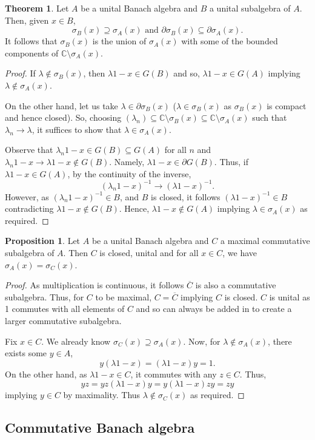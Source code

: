 \documentclass[]{article}
\theoremstyle{definition}
\newtheorem{theorem}{Theorem}
\newtheorem{proposition}{Proposition}[section]
\begin{document}
\begin{theorem}
  Let \(A\) be a unital Banach algebra and \(B\) a unital subalgebra of \(A\). Then, given \(x \in B\), 
  \[\sigma_B(x) \supseteq \sigma_A(x) \text{ and } \partial \sigma_B(x) \subseteq \partial \sigma_A(x).\]
  It follows that \(\sigma_B(x)\) is the union of \(\sigma_A(x)\) with some of the bounded components 
  of \(\mathbb{C} \setminus \sigma_A(x)\).
\end{theorem}
\begin{proof}
  If \(\lambda \not\in \sigma_B(x)\), then \(\lambda 1 - x \in G(B)\) and so, \(\lambda 1 - x \in G(A)\) 
  implying \(\lambda \not\in \sigma_A(x)\). 

  On the other hand, let us take \(\lambda \in \partial \sigma_B(x)\) (\(\lambda \in \sigma_B(x)\) as 
  \(\sigma_B(x)\) is compact and hence closed). So, choosing 
  \((\lambda_n) \subseteq \mathbb{C} \setminus \sigma_B(x) \subseteq \mathbb{C} \setminus \sigma_A(x)\) such that \(\lambda_n \to \lambda\), 
  it suffices to show that \(\lambda \in \sigma_A(x)\).

  Observe that \(\lambda_n 1 - x \in G(B) \subseteq G(A)\) for all \(n\) and 
  \(\lambda_n 1 - x \to \lambda 1 - x \not\in G(B)\). Namely, \(\lambda 1 - x \in \partial G(B)\). 
  Thus, if \(\lambda 1 - x \in G(A)\), by the continuity of the inverse, 
  \[(\lambda_n 1 - x)^{-1} \to (\lambda 1 - x)^{-1}.\]
  However, as \((\lambda_n 1 - x)^{-1} \in B\), and \(B\) is closed, it follows \((\lambda 1 - x)^{-1} \in B\) 
  contradicting \(\lambda 1 - x \not\in G(B)\). Hence, \(\lambda 1 - x \not\in G(A)\) implying 
  \(\lambda \in \sigma_A(x)\) as required. 
\end{proof}

\begin{proposition}
  Let \(A\) be a unital Banach algebra and \(C\) a maximal commutative subalgebra of \(A\). Then \(C\)
  is closed, unital and for all \(x \in C\), we have \(\sigma_A(x) = \sigma_C(x)\).  
\end{proposition}
\begin{proof}
  As multiplication is continuous, it follows \(\overline{C}\) is also a commutative subalgebra. Thus, 
  for \(C\) to be maximal, \(C = \overline{C}\) implying \(C\) is closed. \(C\) is unital as 1 commutes 
  with all elements of \(C\) and so can always be added in to create a larger commutative subalgebra.

  Fix \(x \in C\). We already know \(\sigma_C(x) \supseteq \sigma_A(x)\). Now, for \(\lambda \not\in \sigma_A(x)\), 
  there exists some \(y \in A\), 
  \[y(\lambda 1 - x) = (\lambda 1 - x)y = 1.\]
  On the other hand, as \(\lambda 1 - x \in C\), it commutes with any \(z \in C\). Thus, 
  \[yz = yz(\lambda 1 - x)y = y(\lambda 1 - x)zy = zy\]
  implying \(y \in C\) by maximality. Thus \(\lambda \not\in \sigma_C(x)\) as required.
\end{proof}

\subsection{Commutative Banach algebra}
\end{document}

